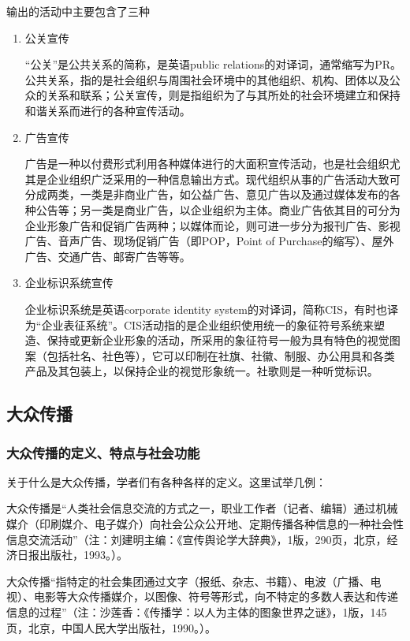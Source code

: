 \documentclass[UTF8,12pt]{ctexart}
\numberwithin{equation}{section} %
\numberwithin{figure}{section}
\numberwithin{table}{section}
\begin{document}
	输出的活动中主要包含了三种
	\begin{enumerate}
		\item 公关宣传
		
		“公关”是公共关系的简称，是英语public relations的对译词，通常缩写为PR。公共关系，指的是社会组织与周围社会环境中的其他组织、机构、团体以及公众的关系和联系；公关宣传，则是指组织为了与其所处的社会环境建立和保持和谐关系而进行的各种宣传活动。
		
		\item 广告宣传
		
		广告是一种以付费形式利用各种媒体进行的大面积宣传活动，也是社会组织尤其是企业组织广泛采用的一种信息输出方式。现代组织从事的广告活动大致可分成两类，一类是非商业广告，如公益广告、意见广告以及通过媒体发布的各种公告等；另一类是商业广告，以企业组织为主体。商业广告依其目的可分为企业形象广告和促销广告两种；以媒体而论，则可进一步分为报刊广告、影视广告、音声广告、现场促销广告（即POP，Point of Purchase的缩写）、屋外广告、交通广告、邮寄广告等等。
		
		\item 企业标识系统宣传
		
		企业标识系统是英语corporate identity system的对译词，简称CIS，有时也译为“企业表征系统”。CIS活动指的是企业组织使用统一的象征符号系统来塑造、保持或更新企业形象的活动，所采用的象征符号一般为具有特色的视觉图案（包括社名、社色等），它可以印制在社旗、社徽、制服、办公用具和各类产品及其包装上，以保持企业的视觉形象统一。社歌则是一种听觉标识。
	\end{enumerate}

	\subsection{大众传播}
	\subsubsection{大众传播的定义、特点与社会功能}
	关于什么是大众传播，学者们有各种各样的定义。这里试举几例：
	
	大众传播是“人类社会信息交流的方式之一，职业工作者（记者、编辑）通过机械媒介（印刷媒介、电子媒介）向社会公众公开地、定期传播各种信息的一种社会性信息交流活动”（注：刘建明主编：《宣传舆论学大辞典》，1版，290页，北京，经济日报出版社，1993。）。
	
	大众传播“指特定的社会集团通过文字（报纸、杂志、书籍）、电波（广播、电视）、电影等大众传播媒介，以图像、符号等形式，向不特定的多数人表达和传递信息的过程”（注：沙莲香：《传播学：以人为主体的图象世界之谜》，1版，145页，北京，中国人民大学出版社，1990。）。
	
\end{document}
